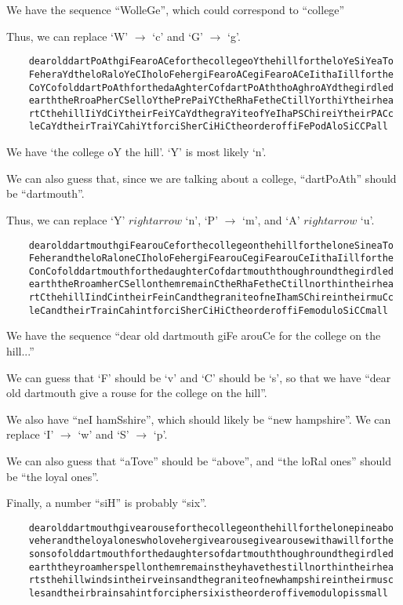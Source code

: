 \begin{Answer}
  \noindent
  We have the sequence ``WolleGe'', which could correspond to
  ``college''

  \noindent
  Thus, we can replace `W' $\rightarrow$ `c' and `G' $\rightarrow$ `g'.

  \begin{Verbatim}
    dearolddartPoAthgiFearoACeforthecollegeoYthehillfortheloYeSiYeaTo
    FeheraYdtheloRaloYeCIholoFehergiFearoACegiFearoACeIithaIillforthe
    CoYCofolddartPoAthforthedaAghterCofdartPoAththoAghroAYdthegirdled
    earththeRroaPherCSelloYthePrePaiYCtheRhaFetheCtillYorthiYtheirhea
    rtCthehillIiYdCiYtheirFeiYCaYdthegraYiteofYeIhaPSChireiYtheirPACc
    leCaYdtheirTraiYCahiYtforciSherCiHiCtheorderoffiFePodAloSiCCPall
  \end{Verbatim}

  \noindent
  We have `the college oY the hill'.
  `Y' is most likely `n'.

  \noindent
  We can also guess that, since we are talking about a college,
  ``dartPoAth'' should be ``dartmouth''.

  Thus, we can replace `Y' $rightarrow$ `n', `P' $\rightarrow$ `m', and `A' $rightarrow$ `u'.
  \begin{Verbatim}
    dearolddartmouthgiFearouCeforthecollegeonthehillfortheloneSineaTo
    FeherandtheloRaloneCIholoFehergiFearouCegiFearouCeIithaIillforthe
    ConCofolddartmouthforthedaughterCofdartmouththoughroundthegirdled
    earththeRroamherCSellonthemremainCtheRhaFetheCtillnorthintheirhea
    rtCthehillIindCintheirFeinCandthegraniteofneIhamSChireintheirmuCc
    leCandtheirTrainCahintforciSherCiHiCtheorderoffiFemoduloSiCCmall
  \end{Verbatim}

  \noindent
  We have the sequence ``dear old dartmouth giFe arouCe for the college on the hill...''

  \noindent
  We can guess that `F' should be `v' and `C' should be `s',
  so that we have ``dear old dartmouth give a rouse for the college on the hill''.

  \noindent
  We also have ``neI hamSshire'', which should likely be ``new hampshire''.
  We can replace `I' $\rightarrow$ `w' and `S' $\rightarrow$ `p'.

  \noindent
  We can also guess that ``aTove'' should be ``above'',
  and ``the loRal ones'' should be ``the loyal ones''.

  \noindent
  Finally, a number ``siH'' is probably ``six''.

  \begin{Verbatim}
    dearolddartmouthgivearouseforthecollegeonthehillforthelonepineabo
    veherandtheloyaloneswholovehergivearousegivearousewithawillforthe
    sonsofolddartmouthforthedaughtersofdartmouththoughroundthegirdled
    earththeyroamherspellonthemremainstheyhavethestillnorthintheirhea
    rtsthehillwindsintheirveinsandthegraniteofnewhampshireintheirmusc
    lesandtheirbrainsahintforciphersixistheorderoffivemodulopissmall
  \end{Verbatim}


\end{Answer}
